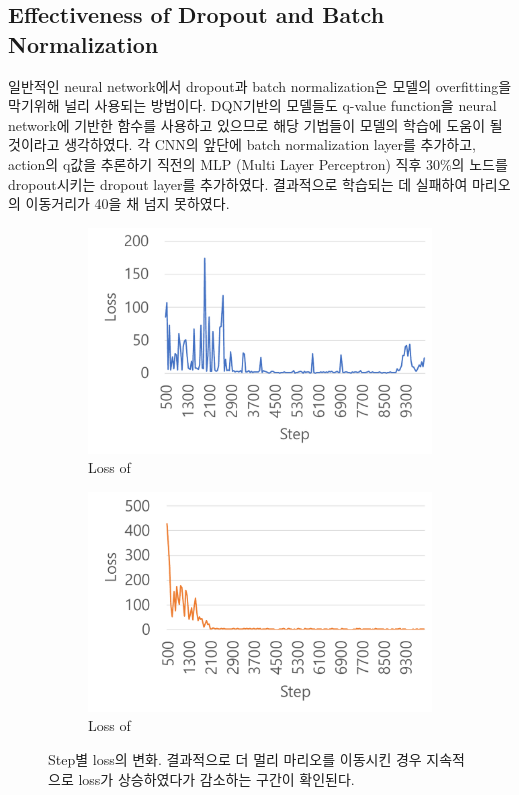 \subsection{Effectiveness of Dropout and Batch Normalization}
\label{sec:exp:dropout}
일반적인 neural network에서 dropout과 batch normalization은 모델의 overfitting을 막기위해 널리 사용되는 방법이다.
DQN기반의 모델들도 q-value function을 neural network에 기반한 함수를 사용하고 있으므로 해당 기법들이 모델의 학습에 도움이 될 것이라고 생각하였다.
  각 CNN의 앞단에 batch normalization layer를 추가하고, action의 q값을 추론하기 직전의 MLP (Multi Layer Perceptron) 직후 30\%의 노드를 dropout시키는 dropout layer를 추가하였다.
결과적으로  학습되는 데 실패하여 마리오의 이동거리가 40을 채 넘지 못하였다.

\begin{figure}[h]
\centering
	\begin{subfigure}[]{.48\textwidth}
		\centering
		\includegraphics[width=1.\textwidth]{FIG/Loss_SADQN.pdf}
		\caption{Loss of \sadqnname}
		\label{fig:loss_sadqn}
	\end{subfigure}%
	\begin{subfigure}[]{.48\textwidth}
		\centering
		\includegraphics[width=1.\textwidth]{FIG/Loss_SAPDQN.pdf}
		\caption{Loss of \sapdqnname}
		\label{fig:loss_sapdqn}
	\end{subfigure}%
\caption{
	Step별 loss의 변화. 결과적으로 더 멀리 마리오를 이동시킨  경우 지속적으로 loss가 상승하였다가 감소하는 구간이 확인된다.
}
\label{fig:loss}
\end{figure}

